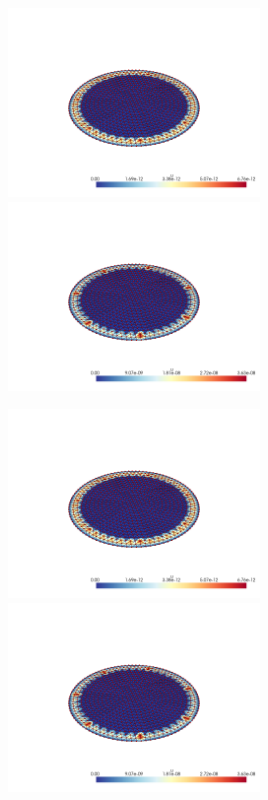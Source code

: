 \documentclass[
  11pt,
]{article}
\let\origfigure\figure
\let\endorigfigure\endfigure
\renewenvironment{figure}[1][2] {
    \expandafter\origfigure\expandafter[H]
} {
    \endorigfigure
}
\begin{document}
\begin{figure}
\caption{Finite element error in the L2 and H1 norms/seminorms, respectively for problem 1 over mesh number 3 using order 5 quadrature.}
\end{figure}

\includegraphics[width=0.5\textwidth,height=\textheight]{../img/mesh3-gauss08-L2.png}
\includegraphics[width=0.5\textwidth,height=\textheight]{../img/mesh3-gauss08-H1.png}

\begin{figure}
\caption{Finite element error in the L2 and H1 norms/seminorms, respectively for problem 1 over mesh number 3 using order 8 quadrature.}
\end{figure}

\includegraphics[width=0.5\textwidth,height=\textheight]{../img/mesh3-gauss13-L2.png}
\includegraphics[width=0.5\textwidth,height=\textheight]{../img/mesh3-gauss13-H1.png}
\end{document}

